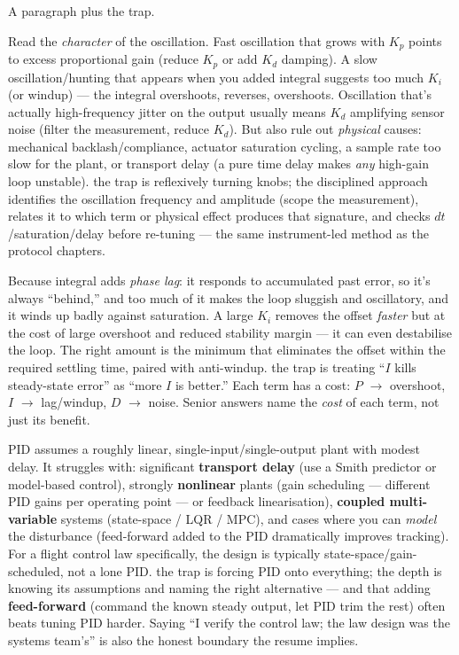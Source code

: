 %
{A paragraph plus the trap.}

Read the \emph{character} of the oscillation. Fast oscillation that grows with
$K_p$ points to excess proportional gain (reduce $K_p$ or add $K_d$ damping). A
slow oscillation/hunting that appears when you added integral suggests too much
$K_i$ (or windup) --- the integral overshoots, reverses, overshoots. Oscillation
that's actually high-frequency jitter on the output usually means $K_d$
amplifying sensor noise (filter the measurement, reduce $K_d$). But also rule out
\emph{physical} causes: mechanical backlash/compliance, actuator saturation
cycling, a sample rate too slow for the plant, or transport delay (a pure time
delay makes \emph{any} high-gain loop unstable). \trap the trap is reflexively
turning knobs; the disciplined approach identifies the oscillation frequency and
amplitude (scope the measurement), relates it to which term or physical effect
produces that signature, and checks $dt$/saturation/delay before re-tuning ---
the same instrument-led method as the protocol chapters.

Because integral adds \emph{phase lag}: it responds to accumulated past error,
so it's always ``behind,'' and too much of it makes the loop sluggish and
oscillatory, and it winds up badly against saturation. A large $K_i$ removes the
offset \emph{faster} but at the cost of large overshoot and reduced stability
margin --- it can even destabilise the loop. The right amount is the minimum that
eliminates the offset within the required settling time, paired with anti-windup.
\trap the trap is treating ``$I$ kills steady-state error'' as ``more $I$ is
better.'' Each term has a cost: $P$ $\rightarrow$ overshoot, $I$ $\rightarrow$
lag/windup, $D$ $\rightarrow$ noise. Senior answers name the \emph{cost} of each
term, not just its benefit.

PID assumes a roughly linear, single-input/single-output plant with modest
delay. It struggles with: significant \textbf{transport delay} (use a Smith
predictor or model-based control), strongly \textbf{nonlinear} plants (gain
scheduling --- different PID gains per operating point --- or feedback
linearisation), \textbf{coupled multi-variable} systems (state-space / LQR /
MPC), and cases where you can \emph{model} the disturbance (feed-forward added to
the PID dramatically improves tracking). For a flight control law specifically,
the design is typically state-space/gain-scheduled, not a lone PID. \trap the
trap is forcing PID onto everything; the depth is knowing its assumptions and
naming the right alternative --- and that adding \textbf{feed-forward} (command
the known steady output, let PID trim the rest) often beats tuning PID harder.
Saying ``I verify the control law; the law design was the systems team's'' is
also the honest boundary the resume implies.

